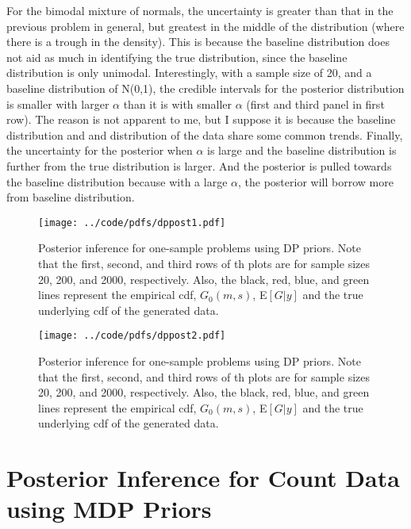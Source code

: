 \documentclass{article}
\def\beginmyfig{\begin{figure}[htbp]\begin{center}}
\def\endmyfig{\end{center}\end{figure}}
\begin{document}
\noindent
For the bimodal mixture of normals, the uncertainty is greater than that in the
previous problem in general, but greatest in the middle of the distribution
(where there is a trough in the density). This is because the baseline distribution
does not aid as much in identifying the true distribution, since the baseline distribution
is only unimodal. Interestingly, with a sample size of 20, and a baseline distribution 
of N(0,1), the credible intervals for the posterior distribution is smaller with larger
$\alpha$ than it is with smaller $\alpha$ (first and third panel in first row). The reason 
is not apparent to me, but I suppose it is because the baseline distribution and 
and distribution of the data share some common trends. Finally, the uncertainty for the
posterior when $\alpha$ is large and the baseline distribution is further from the 
true distribution is larger. And the posterior is pulled towards the baseline 
distribution because with a large $\alpha$, the posterior will borrow more from 
baseline distribution. \\

\beginmyfig
  \texttt{[image: ../code/pdfs/dppost1.pdf]}
  \caption{Posterior inference for one-sample problems using 
  DP priors. Note that the first, second, and third rows of th plots are for
  sample sizes 20, 200, and 2000, respectively.  Also, the black, red, blue, and
  green lines represent the empirical cdf, $G_0(m,s)$, E$[G|y]$ and the true
  underlying cdf of the generated data.}
\endmyfig
\beginmyfig
  \texttt{[image: ../code/pdfs/dppost2.pdf]}
  \caption{Posterior inference for one-sample problems using 
  DP priors. Note that the first, second, and third rows of th plots are for
  sample sizes 20, 200, and 2000, respectively.  Also, the black, red, blue, and
  green lines represent the empirical cdf, $G_0(m,s)$, E$[G|y]$ and the true
  underlying cdf of the generated data.}
\endmyfig


\section{Posterior Inference for Count Data using MDP Priors}
\end{document}
